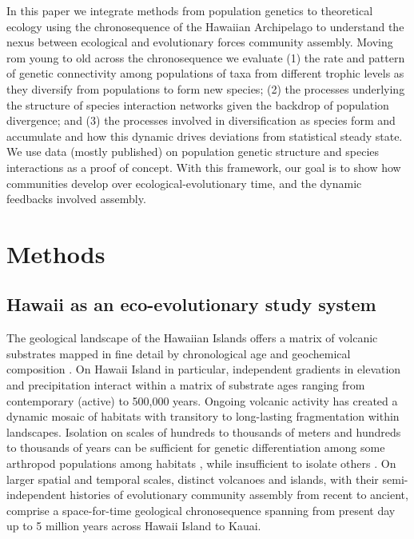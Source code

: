 \documentclass[12pt]{article}
\begin{document}
\begin{linenumbers}
In this paper we integrate methods from population genetics to
theoretical ecology using the chronosequence of the Hawaiian
Archipelago to understand the nexus between ecological and
evolutionary forces community assembly. Moving rom young to old across
the chronosequence we evaluate (1) the rate and pattern of genetic
connectivity among populations of taxa from different trophic levels
as they diversify from populations to form new species; (2) the
processes underlying the structure of species interaction networks
given the backdrop of population divergence; and (3) the processes
involved in diversification as species form and accumulate and how
this dynamic drives deviations from statistical steady state. We use
data (mostly published) on population genetic structure and species
interactions as a proof of concept. With this framework, our goal is
to show how communities develop over ecological-evolutionary time, and
the dynamic feedbacks involved assembly.


\section*{Methods}

\subsection*{Hawaii as an eco-evolutionary study system}

The geological landscape of the Hawaiian Islands offers a matrix of
volcanic substrates mapped in fine detail by chronological age and
geochemical composition \citep{sherrod2007}. On Hawaii Island in
particular, independent gradients in elevation and precipitation
interact within a matrix of substrate ages ranging from contemporary
(active) to 500,000 years. Ongoing volcanic activity has created a
dynamic mosaic of habitats with transitory to long-lasting
fragmentation within landscapes. Isolation on scales of hundreds to
thousands of meters and hundreds to thousands of years can be
sufficient for genetic differentiation among some arthropod
populations among habitats \citep{goodman2012, eldon2013,
  bennett2013}, while insufficient to isolate others
\citep{vandergast2004}. On larger spatial and temporal scales,
distinct volcanoes and islands, with their semi-independent histories
of evolutionary community assembly from recent to ancient, comprise a
space-for-time geological chronosequence spanning from present day up
to 5 million years across Hawaii Island to Kauai.


\end{linenumbers}
\end{document}
